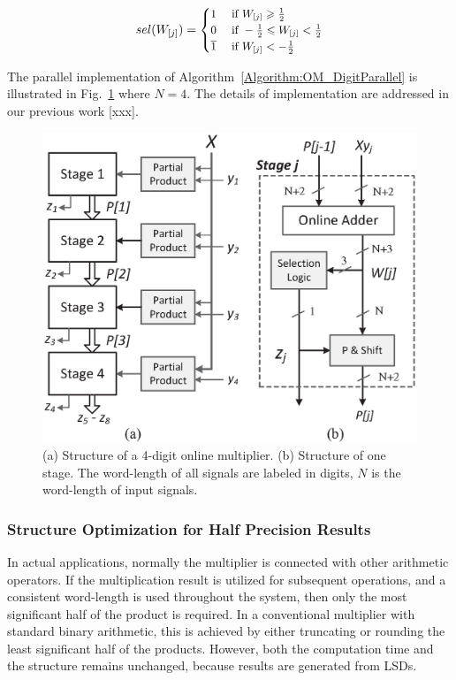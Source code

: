 \begin{eqnarray}\label{Eq:SelFunc_OM}
\small
  sel(W_{[j]})=\begin{cases}
    1 & \text{ if } W_{[j]} \geqslant \frac{1}{2} \\
    0 & \text{ if } -\frac{1}{2}\leqslant W_{[j]}<\frac{1}{2} \\
    \overline{1} & \text{ if } W_{[j]}<-\frac{1}{2}
  \end{cases}
\normalsize
\end{eqnarray}

The parallel implementation of Algorithm~\ref{Algorithm:OM_DigitParallel} is illustrated in Fig.~\ref{Fig:PM} where $N=4$. The details of implementation are addressed in our previous work [xxx].

\begin{figure}[tbp]
  \centering
  \includegraphics[width=.42\textwidth]{./figures/ParallelMult_Structure.eps}
  \caption{(a) Structure of a 4-digit online multiplier. (b) Structure of one stage. The word-length of all signals are labeled in digits, $N$ is the word-length of input signals.}
    \vspace{-2ex}
  \label{Fig:PM}
\end{figure}

\subsubsection{Structure Optimization for Half Precision Results}
In actual applications, normally the multiplier is connected with other arithmetic operators. If the multiplication result is utilized for subsequent operations, and a consistent word-length is used throughout the system, then only the most significant half of the product is required. In a conventional multiplier with standard binary arithmetic, this is achieved by either truncating or rounding the least significant half of the products. However, both the computation time and the structure remains unchanged, because results are generated from LSDs.

